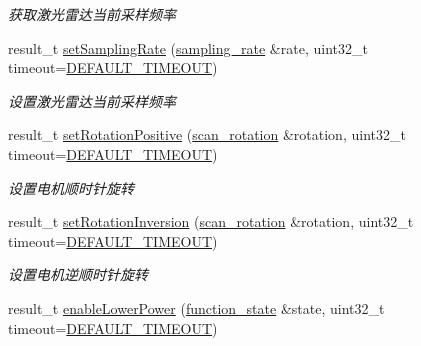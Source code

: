 \begin{DoxyCompactItemize}
\begin{DoxyCompactList}\small\item\em 获取激光雷达当前采样频率 ~\newline
\end{DoxyCompactList}\item 
result\+\_\+t \hyperlink{classydlidar_1_1_y_dlidar_driver_a30f9219bcf3aa3a8df2bbdae983ccd02}{set\+Sampling\+Rate} (\hyperlink{structsampling__rate}{sampling\+\_\+rate} \&rate, uint32\+\_\+t timeout=\hyperlink{classydlidar_1_1_y_dlidar_driver_a13a4f2dc4067b43794b2c47c06d5d27aa07c79ce96f468ff4b40495ef84584442}{D\+E\+F\+A\+U\+L\+T\+\_\+\+T\+I\+M\+E\+O\+UT})
\begin{DoxyCompactList}\small\item\em 设置激光雷达当前采样频率 ~\newline
\end{DoxyCompactList}\item 
result\+\_\+t \hyperlink{classydlidar_1_1_y_dlidar_driver_ae6645c26b9b46b2aa4aaae87521a38f1}{set\+Rotation\+Positive} (\hyperlink{structscan__rotation}{scan\+\_\+rotation} \&rotation, uint32\+\_\+t timeout=\hyperlink{classydlidar_1_1_y_dlidar_driver_a13a4f2dc4067b43794b2c47c06d5d27aa07c79ce96f468ff4b40495ef84584442}{D\+E\+F\+A\+U\+L\+T\+\_\+\+T\+I\+M\+E\+O\+UT})
\begin{DoxyCompactList}\small\item\em 设置电机顺时针旋转 ~\newline
\end{DoxyCompactList}\item 
result\+\_\+t \hyperlink{classydlidar_1_1_y_dlidar_driver_a1569723d0e46b801aee5284455f3b1d1}{set\+Rotation\+Inversion} (\hyperlink{structscan__rotation}{scan\+\_\+rotation} \&rotation, uint32\+\_\+t timeout=\hyperlink{classydlidar_1_1_y_dlidar_driver_a13a4f2dc4067b43794b2c47c06d5d27aa07c79ce96f468ff4b40495ef84584442}{D\+E\+F\+A\+U\+L\+T\+\_\+\+T\+I\+M\+E\+O\+UT})
\begin{DoxyCompactList}\small\item\em 设置电机逆顺时针旋转 ~\newline
\end{DoxyCompactList}\item 
result\+\_\+t \hyperlink{classydlidar_1_1_y_dlidar_driver_a85a9af2aff7201a42f000299990b0ce5}{enable\+Lower\+Power} (\hyperlink{structfunction__state}{function\+\_\+state} \&state, uint32\+\_\+t timeout=\hyperlink{classydlidar_1_1_y_dlidar_driver_a13a4f2dc4067b43794b2c47c06d5d27aa07c79ce96f468ff4b40495ef84584442}{D\+E\+F\+A\+U\+L\+T\+\_\+\+T\+I\+M\+E\+O\+UT})

\end{DoxyCompactItemize}
